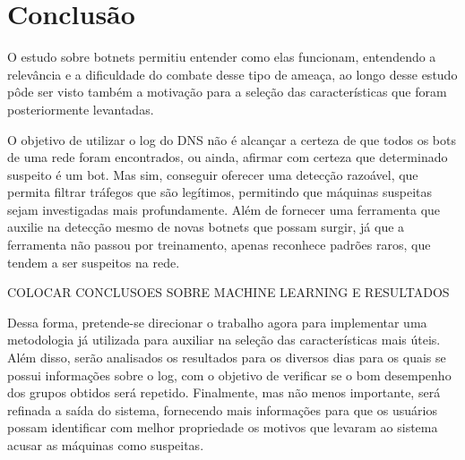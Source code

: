 \chapter{Conclusão}
O estudo sobre botnets permitiu entender como elas funcionam, entendendo a relevância e a dificuldade do combate desse tipo de ameaça, ao longo desse estudo pôde ser visto também a motivação para a seleção das características que foram posteriormente levantadas.

O objetivo de utilizar o log do DNS não é alcançar a certeza de que todos os bots de uma rede foram encontrados, ou ainda, afirmar com certeza que determinado suspeito é um bot. Mas sim, conseguir oferecer uma detecção razoável, que permita filtrar tráfegos que são legítimos, permitindo que máquinas suspeitas sejam investigadas mais profundamente. Além de fornecer uma ferramenta que auxilie na detecção mesmo de novas botnets que possam surgir, já que a ferramenta não passou por treinamento, apenas reconhece padrões raros, que tendem a ser suspeitos na rede.

COLOCAR CONCLUSOES SOBRE MACHINE LEARNING E RESULTADOS

Dessa forma, pretende-se direcionar o trabalho agora para implementar uma metodologia já utilizada para auxiliar na seleção das características mais úteis. Além disso, serão analisados os resultados para os diversos dias para os quais se possui informações sobre o log, com o objetivo de verificar se o bom desempenho dos grupos obtidos será repetido. Finalmente, mas não menos importante, será refinada a saída do sistema, fornecendo mais informações para que os usuários possam identificar com melhor propriedade os motivos que levaram ao sistema acusar as máquinas como suspeitas.